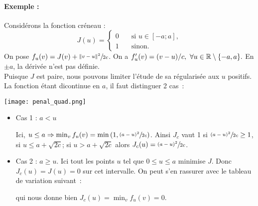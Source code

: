 \documentclass[main.tex]{subfiles}
\begin{document}
\begin{multicols}{2}
\paragraph{Exemple :} Considérons la fonction créneau :
$$J(u)= \left\{  \begin{aligned}
0 \quad & \textrm{si } u \in [-a;a], \\ 1 \quad & \textrm{sinon}. 
\end{aligned}   \right. $$
On pose $f_u(v) = J(v) + \sfrac{\| v-u \|^2}{2c}$.
On a $f'_u(v) = (v-u)/c, \ \forall u \in \mathbb{R} \setminus \{ -a, a \}. $
En $\pm a$, la dérivée n'est pas définie. \\
Puisque $J$ est paire, nous pouvons limiter l'étude de sa régularisée aux $u$ positifs. La fonction étant dicontinue en $a$, il faut distinguer 2 cas~:
\begin{center}
\texttt{[image: penal\_quad.png]}
\end{center}
\end{multicols}
\begin{itemize}
\renewcommand{\labelitemi}{\scriptsize$\bullet$} 
\item Cas 1 : $a < u$
\begin{center}
\end{center}
Ici, $u\leq a \Rightarrow \min_v f_u(v) = \min \left(1, \sfrac{(a-u)^2}{2c} \right)  $. Ainsi $J_c$ vaut 1 si $\sfrac{(a-u)^2}{2c} \geq 1$, \ie si $u\leq a+\sqrt{2c}$; si $u>a+\sqrt{2c}$ alors $J_c(u)=\sfrac{(a-u)^2}{2c}$.
\item Cas 2 : $ a \geq u$. Ici tout les points $u$ tel que $0\leq u \leq a$ minimise $J$. Donc $J_c(u)=J(u)=0$ sur cet intervalle. On peut s'en rassurer avec le tableau de variation suivant~:
\begin{center}
\end{center}
qui nous donne bien $J_c(u) = \min_v f_u(v) = 0$.
\end{itemize}
\end{document}
